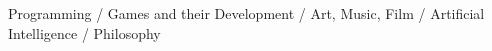 



\begin{cventries}



\small
Programming / Games and their Development / Art, Music, Film / Artificial Intelligence / Philosophy 





\end{cventries}

